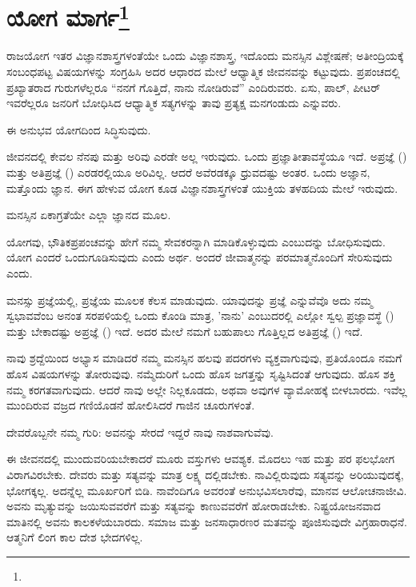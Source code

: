 
\chapter[ಯೋಗ ಮಾರ್ಗ]{ಯೋಗ ಮಾರ್ಗ\protect\footnote{}}

ರಾಜಯೋಗ ಇತರ ವಿಜ್ಞಾನಶಾಸ್ತ್ರಗಳಂತೆಯೇ ಒಂದು ವಿಜ್ಞಾನಶಾಸ್ತ್ರ, ಇದೊಂದು ಮನಸ್ಸಿನ ವಿಶ್ಲೇಷಣೆ; ಅತೀಂದ್ರಿಯಕ್ಕೆ ಸಂಬಂಧಪಟ್ಟ ವಿಷಯಗಳನ್ನು ಸಂಗ್ರಹಿಸಿ ಅದರ ಆಧಾರದ ಮೇಲೆ ಆಧ್ಯಾತ್ಮಿಕ ಜೀವನವನ್ನು ಕಟ್ಟುವುದು. ಪ್ರಪಂಚದಲ್ಲಿ ಪ್ರಖ್ಯಾತರಾದ ಗುರುಗಳೆಲ್ಲರೂ “ನನಗೆ ಗೊತ್ತಿದೆ, ನಾನು ನೋಡಿರುವೆ” ಎಂದಿರುವರು. ಏಸು, ಪಾಲ್, ಪೀಟರ್ ಇವರೆಲ್ಲರೂ ಜನರಿಗೆ ಬೋಧಿಸಿದ ಆಧ್ಯಾತ್ಮಿಕ ಸತ್ಯಗಳನ್ನು ತಾವು ಪ್ರತ್ಯಕ್ಷ ಮನಗಂಡುದು ಎನ್ನುವರು.

ಈ ಅನುಭವ ಯೋಗದಿಂದ ಸಿದ್ಧಿಸುವುದು.

ಜೀವನದಲ್ಲಿ ಕೇವಲ ನೆನಪು ಮತ್ತು ಅರಿವು ಎರಡೇ ಅಲ್ಲ ಇರುವುದು. ಒಂದು ಪ್ರಜ್ಞಾತೀತಾವಸ್ಥೆಯೂ ಇದೆ. ಅಪ್ರಜ್ಞೆ () ಮತ್ತು ಅತಿಪ್ರಜ್ಞೆ () ಎರಡರಲ್ಲಿಯೂ ಅರಿವಿಲ್ಲ. ಆದರೆ ಅವೆರಡಕ್ಕೂ ಧ್ರುವದಷ್ಟು ಅಂತರ. ಒಂದು ಅಜ್ಞಾನ, ಮತ್ತೊಂದು ಜ್ಞಾನ. ಈಗ ಹೇಳುವ ಯೋಗ ಕೂಡ ವಿಜ್ಞಾನಶಾಸ್ತ್ರಗಳಂತೆ ಯುಕ್ತಿಯ ತಳಹದಿಯ ಮೇಲೆ ಇರುವುದು.

ಮನಸ್ಸಿನ ಏಕಾಗ್ರತೆಯೇ ಎಲ್ಲಾ ಜ್ಞಾನದ ಮೂಲ.

ಯೋಗವು, ಭೌತಿಕಪ್ರಪಂಚವನ್ನು ಹೇಗೆ ನಮ್ಮ ಸೇವಕರನ್ನಾಗಿ ಮಾಡಿಕೊಳ್ಳುವುದು ಎಂಬುದನ್ನು ಬೋಧಿಸುವುದು. ಯೋಗ ಎಂದರೆ ಒಂದುಗೂಡಿಸುವುದು ಎಂದು ಅರ್ಥ. ಅಂದರೆ ಜೀವಾತ್ಮನನ್ನು ಪರಮಾತ್ಮನೊಂದಿಗೆ ಸೇರಿಸುವುದು ಎಂದು.

ಮನಸ್ಸು ಪ್ರಜ್ಞೆಯಲ್ಲಿ, ಪ್ರಜ್ಞೆಯ ಮೂಲಕ ಕೆಲಸ ಮಾಡುವುದು. ಯಾವುದನ್ನು ಪ್ರಜ್ಞೆ ಎನ್ನುವೆವೊ ಅದು ನಮ್ಮ ಸ್ವಭಾವವೆಂಬ ಅನಂತ ಸರಪಳಿಯಲ್ಲಿ ಒಂದು ಕೊಂಡಿ ಮಾತ್ರ, 'ನಾನು' ಎಂಬುದರಲ್ಲಿ ಎಲ್ಲೋ ಸ್ವಲ್ಪ ಪ್ರಜ್ಞಾವಸ್ಥೆ () ಮತ್ತು ಬೇಕಾದಷ್ಟು ಅಪ್ರಜ್ಞೆ () ಇದೆ. ಅದರ ಮೇಲೆ ನಮಗೆ ಬಹುಪಾಲು ಗೊತ್ತಿಲ್ಲದ ಅತಿಪ್ರಜ್ಞೆ () ಇದೆ.

ನಾವು ಶ್ರದ್ದೆಯಿಂದ ಅಭ್ಯಾಸ ಮಾಡಿದರೆ ನಮ್ಮ ಮನಸ್ಸಿನ ಹಲವು ಪದರಗಳು ವ್ಯಕ್ತವಾಗುವುವು, ಪ್ರತಿಯೊಂದೂ ನಮಗೆ ಹೊಸ ವಿಷಯಗಳನ್ನು ತೋರುವುವು. ನಮ್ಮೆದುರಿಗೆ ಒಂದು ಹೊಸ ಜಗತ್ತನ್ನು ಸೃಷ್ಟಿಸಿದಂತೆ ಆಗುವುದು. ಹೊಸ ಶಕ್ತಿ ನಮ್ಮ ಕರಗತವಾಗುವುದು. ಆದರೆ ನಾವು ಅಲ್ಲೇ ನಿಲ್ಲಕೂಡದು, ಅಥವಾ ಅವುಗಳ ವ್ಯಾಮೋಹಕ್ಕೆ ಬೀಳಬಾರದು. ಇವೆಲ್ಲ ಮುಂದಿರುವ ವಜ್ರದ ಗಣಿಯೊಡನೆ ಹೋಲಿಸಿದರೆ ಗಾಜಿನ ಚೂರುಗಳಂತೆ.

ದೇವರೊಬ್ಬನೇ ನಮ್ಮ ಗುರಿ: ಅವನನ್ನು ಸೇರದೆ ಇದ್ದರೆ ನಾವು ನಾಶವಾಗುವೆವು.

ಈ ಜೀವನದಲ್ಲಿ ಮುಂದುವರಿಯಬೇಕಾದರೆ ಮೂರು ವಸ್ತುಗಳು ಆವಶ್ಯಕ. ಮೊದಲು ಇಹ ಮತ್ತು ಪರ ಫಲಭೋಗ ವಿರಾಗವಿರಬೇಕು. ದೇವರು ಮತ್ತು ಸತ್ಯವನ್ನು ಮಾತ್ರ ಲಕ್ಷ್ಯ ದಲ್ಲಿಡಬೇಕು. ನಾವಿಲ್ಲಿರುವುದು ಸತ್ಯವನ್ನು ಅರಿಯುವುದಕ್ಕೆ, ಭೋಗಕ್ಕಲ್ಲ. ಅದನ್ನೆಲ್ಲ ಮೂರ್ಖರಿಗೆ ಬಿಡಿ. ನಾವೆಂದಿಗೂ ಅವರಂತೆ ಅನುಭವಿಸಲಾರೆವು, ಮಾನವ ಆಲೋಚನಾಜೀವಿ. ಅವನು ಮೃತ್ಯುವನ್ನು ಜಯಿಸುವವರೆಗೆ ಮತ್ತು ಸತ್ಯವನ್ನು ಕಾಣುವವರೆಗೆ ಹೋರಾಡಬೇಕು. ನಿಷ್ಟ್ರಯೋಜನವಾದ ಮಾತಿನಲ್ಲಿ ಅವನು ಕಾಲಕಳೆಯಬಾರದು. ಸಮಾಜ ಮತ್ತು ಜನಸಾಧಾರಣರ ಮತವನ್ನು ಪೂಜಿಸುವುದೇ ವಿಗ್ರಹಾರಾಧನೆ. ಆತ್ಮನಿಗೆ ಲಿಂಗ ಕಾಲ ದೇಶ ಭೇದಗಳಿಲ್ಲ.

